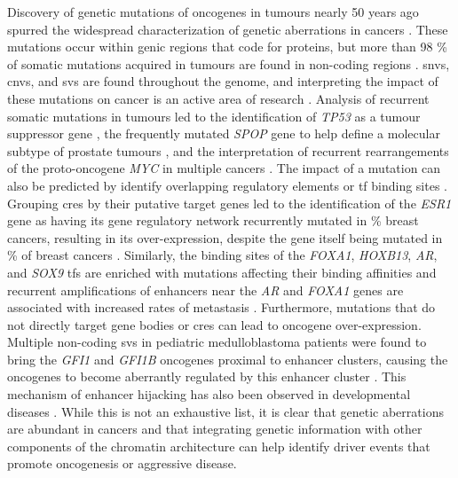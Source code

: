 Discovery of genetic mutations of oncogenes in tumours nearly 50 years ago spurred the widespread characterization of genetic aberrations in cancers \cite{croceOncogenesCancer2008,baileyComprehensiveCharacterizationCancer2018,weinsteinCancerGenomeAtlas2013,PancancerAnalysisWhole2020}.
These mutations occur within genic regions that code for proteins, but more than 98 \% of somatic mutations acquired in tumours are found in non-coding regions \cite{khuranaRoleNoncodingSequence2016}.
\Glspl{snv}, \glspl{cnv}, and \glspl{sv} are found throughout the genome, and interpreting the impact of these mutations on cancer is an active area of research \cite{mooreExpandedEncyclopaediasDNA2020,rheinbayAnalysesNoncodingSomatic2020,PancancerAnalysisWhole2020,zhangHighcoverageWholegenomeAnalysis2020}.
Analysis of recurrent somatic mutations in tumours led to the identification of \emph{TP53} as a tumour suppressor gene \cite{hollsteinP53MutationsHuman1991}, the frequently mutated \emph{SPOP} gene to help define a molecular subtype of prostate tumours \cite{barbieriExomeSequencingIdentifies2012}, and the interpretation of recurrent rearrangements of the proto-oncogene \emph{MYC} in multiple cancers \cite{meyerReflecting25Years2008}.
The impact of a mutation can also be predicted by identify overlapping regulatory elements or \gls{tf} binding sites \cite{mauranoWidespreadSitedependentBuffering2012,cowper-sal*lariBreastCancerRisk2012,kronEnhancerAlterationsCancer2014}.
Grouping \glspl{cre} by their putative target genes led to the identification of the \emph{ESR1} gene as having its gene regulatory network recurrently mutated in  \% breast cancers, resulting in its over-expression, despite the gene itself being mutated in  \% of breast cancers \cite{baileyNoncodingSomaticInherited2016}.
Similarly, the binding sites of the \emph{FOXA1}, \emph{HOXB13}, \emph{AR}, and \emph{SOX9} \glspl{tf} are enriched with mutations affecting their binding affinities \cite{mazrooeiCistromePartitioningReveals2019} and recurrent amplifications of enhancers near the \emph{AR} and \emph{FOXA1} genes are associated with increased rates of metastasis \cite{quigleyGenomicHallmarksStructural2018,paroliaDistinctStructuralClasses2019}.
Furthermore, mutations that do not directly target gene bodies or \glspl{cre} can lead to oncogene over-expression.
Multiple non-coding \glspl{sv} in pediatric medulloblastoma patients were found to bring the \emph{GFI1} and \emph{GFI1B} oncogenes proximal to enhancer clusters, causing the oncogenes to become aberrantly regulated by this enhancer cluster \cite{northcottEnhancerHijackingActivates2014}.
This mechanism of enhancer hijacking has also been observed in developmental diseases \cite{lupianezDisruptionsTopologicalChromatin2015,allouNoncodingDeletionsIdentify2021}.
While this is not an exhaustive list, it is clear that genetic aberrations are abundant in cancers and that integrating genetic information with other components of the chromatin architecture can help identify driver events that promote oncogenesis or aggressive disease.

